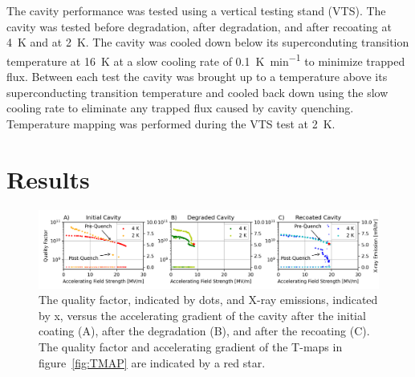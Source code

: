 The cavity performance was tested using a vertical testing stand (VTS). The cavity was tested before degradation, after degradation, and after recoating at \qty{4}{\kelvin} and at \qty{2}{\kelvin}. The cavity was cooled down below its superconduting transition temperature at \qty{16}{\kelvin} at a slow cooling rate of \qty{0.1}{\kelvin\per\minute} to minimize trapped flux. Between each test the cavity was brought up to a temperature above its superconducting transition temperature and cooled back down using the slow cooling rate to eliminate any trapped flux caused by cavity quenching. Temperature mapping was performed during the VTS test at \qty{2}{\kelvin}.

\section{Results}
\label{sec:Results}

\begin{figure}[h]%
    \centering%
    \includegraphics[width=1.0\columnwidth]{./figures/VTS.png}%
    \caption{The quality factor, indicated by dots, and X-ray emissions, indicated by x, versus the accelerating gradient of the cavity after the initial coating (A), after the degradation (B), and after the recoating (C). The quality factor and accelerating gradient of the T-maps in figure~{\protect\ref{fig:TMAP}} are indicated by a red star.}%
    \label{fig:VTS}%
\end{figure}

